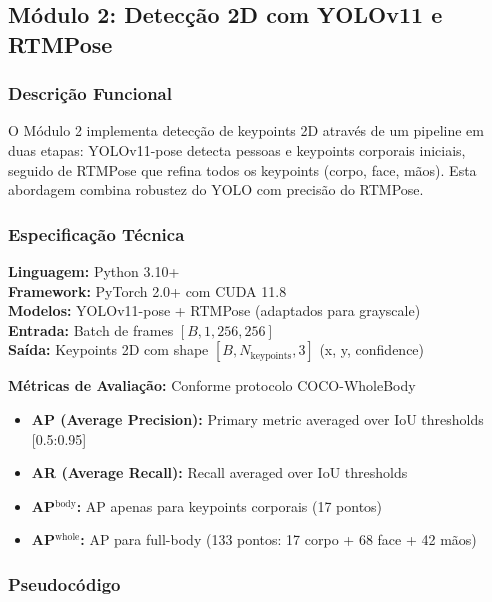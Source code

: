 \documentclass[12pt, a4paper]{article}
\begin{document}
\subsection{Módulo 2: Detecção 2D com YOLOv11 e RTMPose}

\subsubsection{Descrição Funcional}

O Módulo 2 implementa detecção de keypoints 2D através de um pipeline em duas etapas: YOLOv11-pose detecta pessoas e keypoints corporais iniciais, seguido de RTMPose que refina todos os keypoints (corpo, face, mãos). Esta abordagem combina robustez do YOLO com precisão do RTMPose.

\subsubsection{Especificação Técnica}

\textbf{Linguagem:} Python 3.10+\\
\textbf{Framework:} PyTorch 2.0+ com CUDA 11.8\\
\textbf{Modelos:} YOLOv11-pose + RTMPose (adaptados para grayscale)\\
\textbf{Entrada:} Batch de frames $[B, 1, 256, 256]$\\
\textbf{Saída:} Keypoints 2D com shape $[B, N_{\mathrm{keypoints}}, 3]$ (x, y, confidence)

\textbf{Métricas de Avaliação:} Conforme protocolo COCO-WholeBody
\begin{itemize}
    \item \textbf{AP (Average Precision):} Primary metric averaged over IoU thresholds [0.5:0.95]
    \item \textbf{AR (Average Recall):} Recall averaged over IoU thresholds
    \item \textbf{AP$^{\text{body}}$:} AP apenas para keypoints corporais (17 pontos)
    \item \textbf{AP$^{\text{whole}}$:} AP para full-body (133 pontos: 17 corpo + 68 face + 42 mãos)
\end{itemize}

\subsubsection{Pseudocódigo}
\end{document}
